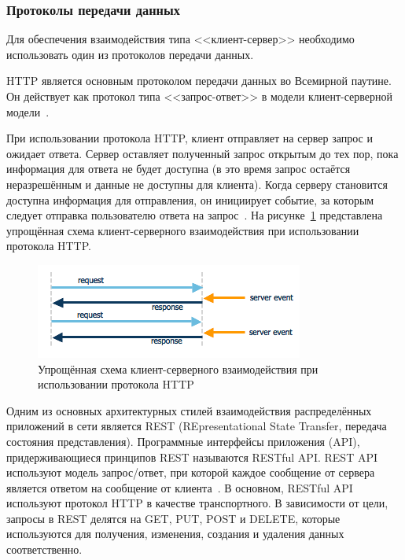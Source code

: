 \subsubsection{Протоколы передачи данных}

Для обеспечения взаимодействия типа <<клиент-сервер>> необходимо использовать один из протоколов передачи данных.

HTTP является основным протоколом передачи данных во Всемирной паутине. Он действует как протокол типа <<запрос-ответ>> в модели клиент-серверной модели~\cite{http_websockets}.

При использовании протокола HTTP, клиент отправляет на сервер запрос и ожидает ответа. Сервер оставляет полученный запрос открытым до тех пор, пока информация для ответа не будет доступна (в это время запрос остаётся неразрешённым и данные не доступны для клиента). Когда серверу становится доступна информация для отправления, он инициирует событие, за которым следует отправка пользователю ответа на запрос~\cite{http_websockets}. На рисунке~\ref{img:http__schema} представлена упрощённая схема клиент-серверного взаимодействия при использовании протокола HTTP.

\begin{figure}[H]
  \centering
  \includegraphics[height=0.15\textheight]{assets/images/theoretical2/http_schema.png}
  \caption{Упрощённая схема клиент-серверного взаимодействия при использовании протокола HTTP}
  \label{img:http__schema}
\end{figure}

Одним из основных архитектурных стилей взаимодействия распределённых приложений в сети является REST (REpresentational State Transfer, передача состояния представления). Программные интерфейсы приложения (API), придерживающиеся принципов REST называются RESTful API. REST API используют модель запрос/ответ, при которой каждое сообщение от сервера является ответом на сообщение от клиента~\cite{http_websockets}. В основном, RESTful API используют протокол HTTP в качестве транспортного. В зависимости от цели, запросы в REST делятся на GET, PUT, POST и DELETE, которые используются для получения, изменения, создания и удаления данных соответственно.

